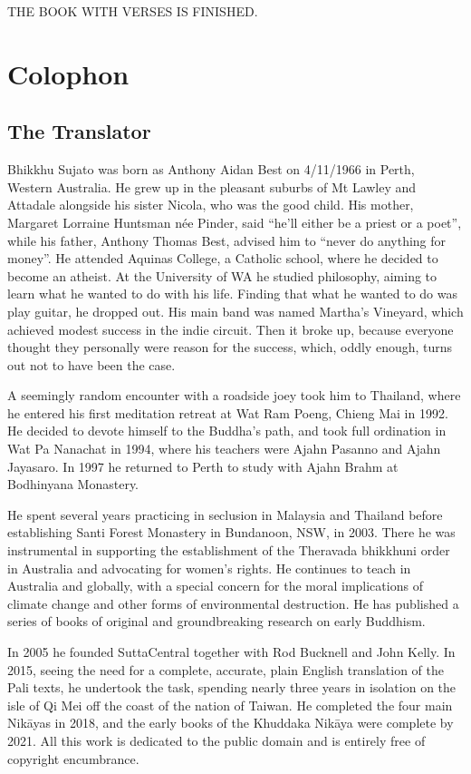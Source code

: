 \documentclass[12pt,openany]{book}%
\newcommand*{\scendbook}[1]{\begin{center}\uppercase{#1}\end{center}}
\let\oldbackmatter\backmatter
\renewcommand{\backmatter}{%
\chapterfont{\setstretch{.85}\normalfont\centering}%
\sectionfont{\setstretch{.85}\Semiboldsubheadfont}%
\oldbackmatter}
\begin{document}
\scendbook{The Book With Verses is finished. }

%
\backmatter%
\chapter*{Colophon}

\section*{The Translator}

Bhikkhu Sujato was born as Anthony Aidan Best on 4/11/1966 in Perth, Western Australia. He grew up in the pleasant suburbs of Mt Lawley and Attadale alongside his sister Nicola, who was the good child. His mother, Margaret Lorraine Huntsman née Pinder, said “he’ll either be a priest or a poet”, while his father, Anthony Thomas Best, advised him to “never do anything for money”. He attended Aquinas College, a Catholic school, where he decided to become an atheist. At the University of WA he studied philosophy, aiming to learn what he wanted to do with his life. Finding that what he wanted to do was play guitar, he dropped out. His main band was named Martha’s Vineyard, which achieved modest success in the indie circuit. Then it broke up, because everyone thought they personally were reason for the success, which, oddly enough, turns out not to have been the case. 

A seemingly random encounter with a roadside joey took him to Thailand, where he entered his first meditation retreat at Wat Ram Poeng, Chieng Mai in 1992. He decided to devote himself to the Buddha’s path, and took full ordination in Wat Pa Nanachat in 1994, where his teachers were Ajahn Pasanno and Ajahn Jayasaro. In 1997 he returned to Perth to study with Ajahn Brahm at Bodhinyana Monastery. 

He spent several years practicing in seclusion in Malaysia and Thailand before establishing Santi Forest Monastery in Bundanoon, NSW, in 2003. There he was instrumental in supporting the establishment of the Theravada bhikkhuni order in Australia and advocating for women’s rights. He continues to teach in Australia and globally, with a special concern for the moral implications of climate change and other forms of environmental destruction. He has published a series of books of original and groundbreaking research on early Buddhism. 

In 2005 he founded SuttaCentral together with Rod Bucknell and John Kelly. In 2015, seeing the need for a complete, accurate, plain English translation of the Pali texts, he undertook the task, spending nearly three years in isolation on the isle of Qi Mei off the coast of the nation of Taiwan. He completed the four main \textsanskrit{Nikāyas} in 2018, and the early books of the Khuddaka \textsanskrit{Nikāya} were complete by 2021. All this work is dedicated to the public domain and is entirely free of copyright encumbrance. 
\end{document}
